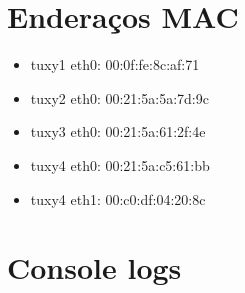 \documentclass[11pt,a4paper,reqno]{report}
\numberwithin{equation}{section}
\begin{document}
\begin{appendices}

\chapter{Enderaços MAC}
\label{mac_addresses}
\begin{itemize} 
\item tuxy1 eth0: 00:0f:fe:8c:af:71
\item tuxy2 eth0: 00:21:5a:5a:7d:9c
\item tuxy3 eth0: 00:21:5a:61:2f:4e
\item tuxy4 eth0: 00:21:5a:c5:61:bb
\item tuxy4 eth1: 00:c0:df:04:20:8c
\end{itemize}

\chapter{Console logs}%


\end{appendices}
\end{document}
